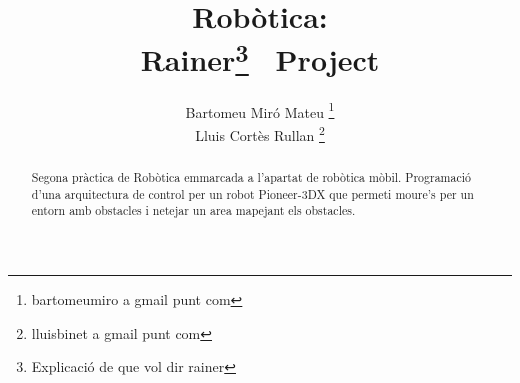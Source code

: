 \documentclass[a4paper,11pt]{scrartcl}
\title{Robòtica: \\ Rainer\footnote{Explicació de que vol dir rainer} \ Project}
\author{ Bartomeu Miró Mateu \thanks{bartomeumiro a gmail punt com} \\
	 Lluis Cortès Rullan \thanks{lluisbinet a gmail punt com} }
\begin{document}
  \maketitle

  \begin{abstract}
    Segona pràctica de Robòtica emmarcada a l'apartat de robòtica mòbil.
    Programació d'una arquitectura de control per un robot Pioneer-3DX que
    permeti moure’s per un entorn amb obstacles i netejar un area mapejant
    els obstacles.
  \end{abstract}

  \newpage
  \setcounter{page}{2}
  \tableofcontents
  \newpage

  
  
  
  
  
  
  
\end{document}
